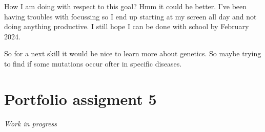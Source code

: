 \documentclass[
]{book}
\begin{document}
How I am doing with respect to this goal? Hmm it could be better. I've been having troubles with focussing so I end up starting at my screen all day and not doing anything productive. I still hope I can be done with school by February 2024.

So for a next skill it would be nice to learn more about genetics. So maybe trying to find if some mutations occur ofter in specific diseases.

\hypertarget{portfolio-assigment-5}{%
\chapter{Portfolio assigment 5}\label{portfolio-assigment-5}}

\emph{Work in progress}
\end{document}
